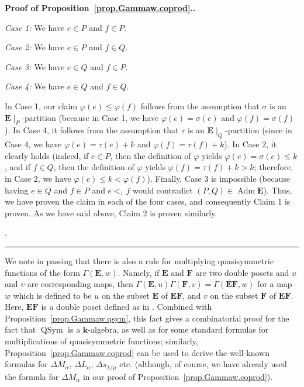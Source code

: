 \documentclass[numbers=enddot,12pt,final,onecolumn,notitlepage,abstracton]{scrartcl}%
\theoremstyle{definition}
\newenvironment{proof}[1][Proof]{\noindent\textbf{#1.} }{\ \rule{0.5em}{0.5em}}
\newcommand{\kk}{{\mathbf{k}}}
\newcommand{\Adm}{\operatorname{Adm}}
\newcommand{\QSym}{{\operatorname{QSym}}}
\newcommand{\EE}{{\mathbf{E}}}
\newcommand{\FF}{{\mathbf{F}}}
\begin{document}
\begin{proof}[Proof of Proposition~\ref{prop.Gammaw.coprod}.]
{\textit{Case 1:} We have $e \in P$ and $f \in P$.

\textit{Case 2:} We have $e \in P$ and $f \in Q$.

\textit{Case 3:} We have $e \in Q$ and $f \in P$.

\textit{Case 4:} We have $e \in Q$ and $f \in Q$.

In Case 1, our claim
$\varphi\left(e\right) \leq \varphi\left(f\right)$ follows
from the assumption that $\sigma$ is an
$\EE\mid_P$-partition (because in Case 1,
we have $\varphi\left(e\right) = \sigma\left(e\right)$
and $\varphi\left(f\right) = \sigma\left(f\right)$).
In Case 4, it follows from the
assumption that $\tau$ is an $\EE\mid_Q$-partition
(since in Case 4, we have
$\varphi\left(e\right) = \tau\left(e\right) + k$ and
$\varphi\left(f\right) = \tau\left(f\right) + k$). In
Case 2, it clearly holds (indeed,
if $e \in P$, then the definition of $\varphi$ yields
$\varphi\left(e\right) = \sigma\left(e\right) \leq k$,
and if $f \in Q$, then
the definition of $\varphi$ yields
$\varphi\left(f\right) = \tau\left(f\right) + k > k$;
therefore, in Case 2, we have
$\varphi\left(e\right) \leq k < \varphi\left(f\right)$).
Finally, Case 3 is impossible (because having $e \in Q$
and $f \in P$ and $e <_1 f$ would contradict
$\left(P, Q\right) \in \Adm \EE$). Thus, we have proven the
claim in each of the four cases, and consequently Claim 1 is
proven. As we have said above, Claim 2 is proven similarly.}.
\end{proof}


We note in passing that there is also a rule for multiplying
quasisymmetric functions of the form $\Gamma\left(\EE, w\right)$.
Namely, if $\EE$ and $\FF$ are two double posets and $u$ and $v$
are corresponding maps, then $\Gamma\left(\EE, u\right)
\Gamma\left(\FF, v\right) = \Gamma\left(\EE \FF, w\right)$ for a
map $w$ which is defined to be $u$ on the subset $\EE$ of
$\EE \FF$, and $v$ on the subset $\FF$ of $\EE \FF$. Here, $\EE \FF$
is a double poset defined as in \cite[\S 2.1]{Mal-Reu-DP}.
Combined with Proposition~\ref{prop.Gammaw.qsym}, this fact gives
a combinatorial proof for the fact that $\QSym$ is a $\kk$-algebra,
as well as for some standard formulas for multiplications of
quasisymmetric functions; similarly,
Proposition~\ref{prop.Gammaw.coprod} can be used to derive the
well-known formulas for $\Delta M_\alpha$, $\Delta L_\alpha$,
$\Delta s_{\lambda / \mu}$ etc. (although, of course, we have
already used the formula for $\Delta M_\alpha$ in our proof of
Proposition~\ref{prop.Gammaw.coprod}).
\end{document}
